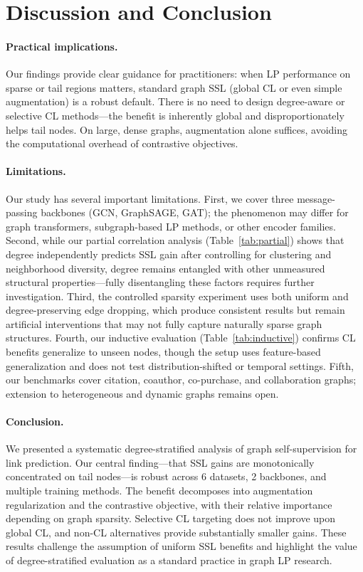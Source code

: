 \section{Discussion and Conclusion}
\label{sec:discussion}

\paragraph{Practical implications.}
Our findings provide clear guidance for practitioners: when LP performance on sparse or tail regions matters, standard graph SSL (global CL or even simple augmentation) is a robust default. There is no need to design degree-aware or selective CL methods---the benefit is inherently global and disproportionately helps tail nodes. On large, dense graphs, augmentation alone suffices, avoiding the computational overhead of contrastive objectives.

\paragraph{Limitations.}
Our study has several important limitations. First, we cover three message-passing backbones (GCN, GraphSAGE, GAT); the phenomenon may differ for graph transformers, subgraph-based LP methods, or other encoder families. Second, while our partial correlation analysis (Table~\ref{tab:partial}) shows that degree independently predicts SSL gain after controlling for clustering and neighborhood diversity, degree remains entangled with other unmeasured structural properties---fully disentangling these factors requires further investigation. Third, the controlled sparsity experiment uses both uniform and degree-preserving edge dropping, which produce consistent results but remain artificial interventions that may not fully capture naturally sparse graph structures. Fourth, our inductive evaluation (Table~\ref{tab:inductive}) confirms CL benefits generalize to unseen nodes, though the setup uses feature-based generalization and does not test distribution-shifted or temporal settings. Fifth, our benchmarks cover citation, coauthor, co-purchase, and collaboration graphs; extension to heterogeneous and dynamic graphs remains open.

\paragraph{Conclusion.}
We presented a systematic degree-stratified analysis of graph self-supervision for link prediction. Our central finding---that SSL gains are monotonically concentrated on tail nodes---is robust across 6 datasets, 2 backbones, and multiple training methods. The benefit decomposes into augmentation regularization and the contrastive objective, with their relative importance depending on graph sparsity. Selective CL targeting does not improve upon global CL, and non-CL alternatives provide substantially smaller gains. These results challenge the assumption of uniform SSL benefits and highlight the value of degree-stratified evaluation as a standard practice in graph LP research.
